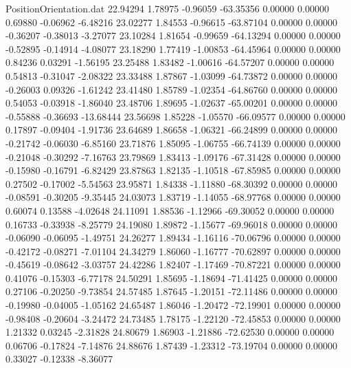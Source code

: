 \begin{filecontents}{PositionOrientation.dat}
  22.94294    1.78975   -0.96059   -63.35356    0.00000    0.00000    0.69880   -0.06962   -6.48216
  23.02277    1.84553   -0.96615   -63.87104    0.00000    0.00000   -0.36207   -0.38013   -3.27077
  23.10284    1.81654   -0.99659   -64.13294    0.00000    0.00000   -0.52895   -0.14914   -4.08077
  23.18290    1.77419   -1.00853   -64.45964    0.00000    0.00000    0.84236    0.03291   -1.56195
  23.25488    1.83482   -1.00616   -64.57207    0.00000    0.00000    0.54813   -0.31047   -2.08322
  23.33488    1.87867   -1.03099   -64.73872    0.00000    0.00000   -0.26003    0.09326   -1.61242
  23.41480    1.85789   -1.02354   -64.86760    0.00000    0.00000    0.54053   -0.03918   -1.86040
  23.48706    1.89695   -1.02637   -65.00201    0.00000    0.00000   -0.55888   -0.36693  -13.68444
  23.56698    1.85228   -1.05570   -66.09577    0.00000    0.00000    0.17897   -0.09404   -1.91736
  23.64689    1.86658   -1.06321   -66.24899    0.00000    0.00000   -0.21742   -0.06030   -6.85160
  23.71876    1.85095   -1.06755   -66.74139    0.00000    0.00000   -0.21048   -0.30292   -7.16763
  23.79869    1.83413   -1.09176   -67.31428    0.00000    0.00000   -0.15980   -0.16791   -6.82429
  23.87863    1.82135   -1.10518   -67.85985    0.00000    0.00000    0.27502   -0.17002   -5.54563
  23.95871    1.84338   -1.11880   -68.30392    0.00000    0.00000   -0.08591   -0.30205   -9.35445
  24.03073    1.83719   -1.14055   -68.97768    0.00000    0.00000    0.60074    0.13588   -4.02648
  24.11091    1.88536   -1.12966   -69.30052    0.00000    0.00000    0.16733   -0.33938   -8.25779
  24.19080    1.89872   -1.15677   -69.96018    0.00000    0.00000   -0.06090   -0.06095   -1.49751
  24.26277    1.89434   -1.16116   -70.06796    0.00000    0.00000   -0.42172   -0.08271   -7.01104
  24.34279    1.86060   -1.16777   -70.62897    0.00000    0.00000   -0.45619   -0.08642   -3.03757
  24.42286    1.82407   -1.17469   -70.87221    0.00000    0.00000    0.41076   -0.15303   -6.77178
  24.50291    1.85695   -1.18694   -71.41425    0.00000    0.00000    0.27106   -0.20250   -9.73854
  24.57485    1.87645   -1.20151   -72.11486    0.00000    0.00000   -0.19980   -0.04005   -1.05162
  24.65487    1.86046   -1.20472   -72.19901    0.00000    0.00000   -0.98408   -0.20604   -3.24472
  24.73485    1.78175   -1.22120   -72.45853    0.00000    0.00000    1.21332    0.03245   -2.31828
  24.80679    1.86903   -1.21886   -72.62530    0.00000    0.00000    0.06706   -0.17824   -7.14876
  24.88676    1.87439   -1.23312   -73.19704    0.00000    0.00000    0.33027   -0.12338   -8.36077

\end{filecontents}
